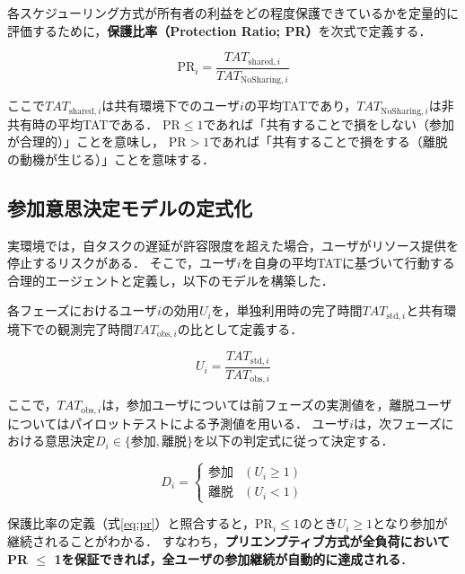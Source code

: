 \documentclass[12pt,a4paper]{jsarticle}
\begin{document}
各スケジューリング方式が所有者の利益をどの程度保護できているかを定量的に評価するために，\textbf{保護比率（Protection Ratio; PR）}を次式で定義する．

\begin{equation}
  \mathrm{PR}_i = \frac{TAT_{\mathrm{shared},i}}{TAT_{\mathrm{NoSharing},i}}
  \label{eq:pr}
\end{equation}

ここで$TAT_{\mathrm{shared},i}$は共有環境下でのユーザ$i$の平均TATであり，$TAT_{\mathrm{NoSharing},i}$は非共有時の平均TATである．
$\mathrm{PR} \leq 1$であれば「共有することで損をしない（参加が合理的）」ことを意味し，
$\mathrm{PR} > 1$であれば「共有することで損をする（離脱の動機が生じる）」ことを意味する．

\subsection{参加意思決定モデルの定式化}

実環境では，自タスクの遅延が許容限度を超えた場合，ユーザがリソース提供を停止するリスクがある．
そこで，ユーザ$i$を自身の平均TATに基づいて行動する合理的エージェントと定義し，以下のモデルを構築した．

各フェーズにおけるユーザ$i$の効用$U_i$を，単独利用時の完了時間$TAT_{\mathrm{std},i}$と共有環境下での観測完了時間$TAT_{\mathrm{obs},i}$の比として定義する．

\begin{equation}
  U_i = \frac{TAT_{\mathrm{std},i}}{TAT_{\mathrm{obs},i}}
  \label{eq:utility}
\end{equation}

ここで，$TAT_{\mathrm{obs},i}$は，参加ユーザについては前フェーズの実測値を，離脱ユーザについてはパイロットテストによる予測値を用いる．
ユーザ$i$は，次フェーズにおける意思決定$D_i \in \{\text{参加}, \text{離脱}\}$を以下の判定式に従って決定する．

\begin{equation}
  D_i = \begin{cases}
    \text{参加} & (U_i \geq 1) \\
    \text{離脱} & (U_i < 1)
  \end{cases}
  \label{eq:decision}
\end{equation}

保護比率の定義（式\ref{eq:pr}）と照合すると，$\mathrm{PR}_i \leq 1$のとき$U_i \geq 1$となり参加が継続されることがわかる．
すなわち，\textbf{プリエンプティブ方式が全負荷においてPR $\leq$ 1を保証できれば，全ユーザの参加継続が自動的に達成される}．
\end{document}
